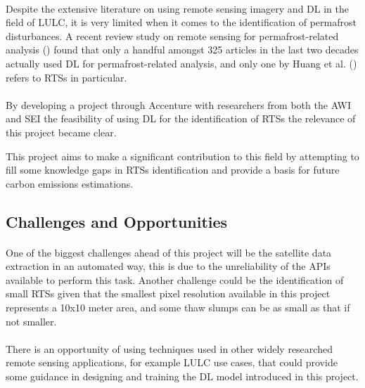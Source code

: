 \paragraph{}
Despite the extensive literature on using remote sensing imagery and \gls{DL} in the field of \gls{LULC}, it is very limited when it comes to the identification of permafrost disturbances.
A recent review study on remote sensing for permafrost-related analysis (\cite{rs13061217}) found that only a handful amongst 325 articles in the last two decades actually used \gls{DL} for permafrost-related analysis, and only one by Huang et al. (\cite{HUANG2020111534}) refers to \gls{RTS}s in particular. 

\paragraph{}
By developing a project through Accenture with researchers from both the \gls{AWI} and \gls{SEI} the feasibility of using DL for the identification of \gls{RTS}s the relevance of this project became clear.

This project aims to make a significant contribution to this field by attempting to fill some knowledge gaps in \gls{RTS}s identification and provide a basis for future carbon emissions estimations.

\subsection{Challenges and Opportunities} \label{challenges}
\paragraph{}
One of the biggest challenges ahead of this project will be the satellite data extraction in an automated way, this is due to the unreliability of the \gls{API}s available to perform this task. Another challenge could be the identification of small \gls{RTS}s given that the smallest pixel resolution available in this project represents a 10x10 meter area, and some thaw slumps can be as small as that if not smaller.
\paragraph{}
There is an opportunity of using techniques used in other widely researched remote sensing applications, for example \gls{LULC} use cases, that could provide some guidance in designing and training the DL model introduced in this project.

